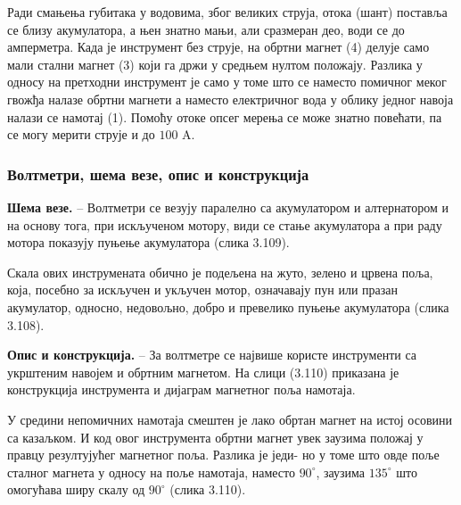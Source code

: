 \documentclass[12pt,a4paper]{report}
\begin{document}
Ради смањења губитака у водовима, због великих струја, отока (шант) поставља се близу акумулатора, а њен знатно мањи, али сразмеран део, води се до амперметра.
Када је инструмент без струје, на обртни магнет (4) делује само мали стални магнет (3) који га држи у средњем нултом положају. Разлика у односу на претходни инструмент је само у томе што се наместо помичног меког гвожђа налазе обртни магнети а наместо електричног вода у облику једног навоја налази се намотај (1). Помоћу отоке опсег мерења се може знатно повећати, па се могу мерити струје и до $100\text{ A}$.

\subsubsection{Волтметри, шема везе, опис и конструкција}

\textbf{Шема везе.} – Волтметри се везују паралелно са акумулатором и алтернатором и на основу тога, при искљученом мотору, види се стање акумулатора а при раду мотора показују пуњење акумулатора (слика 3.109).

Скала ових инструмената обично је подељена на жуто, зелено и црвена поља, која, посебно за искључен и укључен мотор, означавају пун или празан акумулатор, односно, недовољно, добро и превелико пуњење акумулатора (слика 3.108).


\textbf{Опис и конструкција.} – За волтметре се највише користе инструменти са укрштеним навојем и обртним магнетом. На слици (3.110) приказана је конструкција инструмента и дијаграм магнетног поља намотаја.

У средини непомичних намотаја смештен је лако обртан магнет на истој осовини са казаљком. И код овог инструмента обртни магнет увек заузима положај у правцу резултујућег магнетног поља. Разлика је једи-%
%
но у томе што овде поље сталног магнета у односу на поље намотаја, наместо $90^\circ$, заузима $135^\circ$ што омогућава ширу скалу од $90^\circ$ (слика 3.110).
\end{document}
